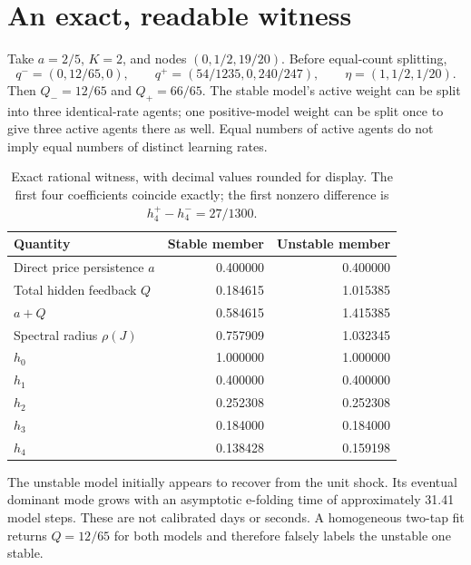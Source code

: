 \documentclass[11pt]{article}
\theoremstyle{remark}\newtheorem{remark}[theorem]{Remark}
\begin{document}
\section{An exact, readable witness}\label{sec:witness}
Take $a=2/5$, $K=2$, and nodes $(0,1/2,19/20)$. Before equal-count splitting,
\begin{equation}
 q^-=(0,12/65,0),\qquad q^+=(54/1235,0,240/247),
 \qquad \eta=(1,1/2,1/20).
\end{equation}
Then $Q_-=12/65$ and $Q_+=66/65$. The stable model's active weight can be split into three identical-rate agents; one positive-model weight can be split once to give three active agents there as well. Equal numbers of active agents do not imply equal numbers of distinct learning rates.
\begin{table}[ht]
\centering\small
\begin{tabular}{lrr}
\toprule Quantity&Stable member&Unstable member\\\midrule
Direct price persistence $a$&0.400000&0.400000\\
Total hidden feedback $Q$&0.184615&1.015385\\
$a+Q$&0.584615&1.415385\\
Spectral radius $\rho(J)$&0.757909&1.032345\\
$h_0$&1.000000&1.000000\\
$h_1$&0.400000&0.400000\\
$h_2$&0.252308&0.252308\\
$h_3$&0.184000&0.184000\\
$h_4$&0.138428&0.159198\\\bottomrule
\end{tabular}
\caption{Exact rational witness, with decimal values rounded for display. The first four coefficients coincide exactly; the first nonzero difference is $h_4^+-h_4^-=27/1300$.}
\end{table}
The unstable model initially appears to recover from the unit shock. Its eventual dominant mode grows with an asymptotic e-folding time of approximately 31.41 model steps. These are not calibrated days or seconds. A homogeneous two-tap fit returns $Q=12/65$ for both models and therefore falsely labels the unstable one stable.
\end{document}
